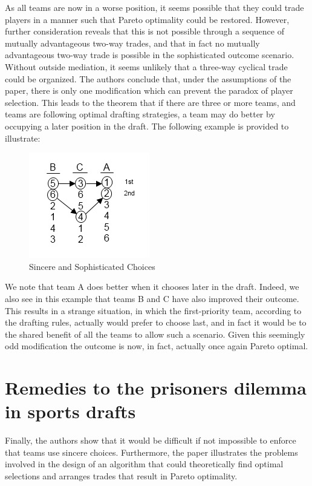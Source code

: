 \documentclass{article}
\begin{document}
As all teams are now in a worse position, it seems possible that they could trade players in a manner such that Pareto optimality could be restored. However, further consideration reveals that this is not possible through a sequence of mutually advantageous two-way trades, and that in fact no mutually advantageous two-way trade is possible in the sophisticated outcome scenario. Without outside mediation, it seems unlikely that a three-way cyclical trade could be organized. The authors conclude that, under the assumptions of the paper, there is only one modification which can prevent the paradox of player selection. This leads to the theorem that if there are three or more teams, and teams are following optimal drafting strategies, a team may do better by occupying a later position in the draft. The following example is provided to illustrate:

\begin{figure}[H]
	\centering
	\includegraphics[scale=1.0]{ThreeOrMoreSincereAndSophisticated}
	\caption{Sincere and Sophisticated Choices}
\end{figure}

We note that team A does better when it chooses later in the draft. Indeed, we also see in this example that teams B and C have also improved their outcome. This results in a strange situation, in which the first-priority team, according to the drafting rules, actually would prefer to choose last, and in fact it would be to the shared benefit of all the teams to allow such a scenario. Given this seemingly odd modification the outcome is now, in fact, actually once again Pareto optimal.

\section{Remedies to the prisoners dilemma in sports drafts}

Finally, the authors show that it would be difficult if not impossible to enforce that teams use sincere choices. Furthermore, the paper illustrates the problems involved in the design of an algorithm that could theoretically find optimal selections and arranges trades that result in Pareto optimality. 
\end{document}

